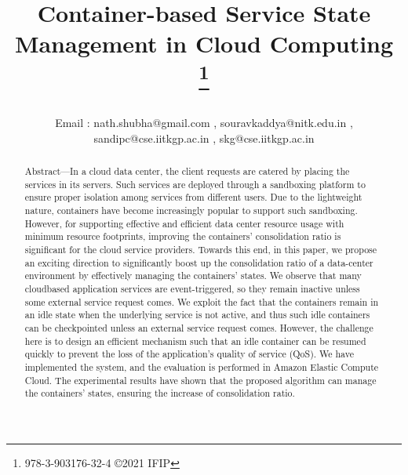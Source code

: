\documentclass[conference]{IEEEtran}
\begin{document}
\title{Container-based Service State Management in
Cloud Computing\\
\thanks{978-3-903176-32-4 ©2021 IFIP}

}

\author{
 Email : nath.shubha@gmail.com , souravkaddya@nitk.edu.in , sandipc@cse.iitkgp.ac.in , skg@cse.iitkgp.ac.in


}

\maketitle

\begin{abstract}
Abstract—In a cloud data center, the client requests are catered
by placing the services in its servers. Such services are deployed through a sandboxing platform to ensure proper isolation
among services from different users. Due to the lightweight
nature, containers have become increasingly popular to support
such sandboxing. However, for supporting effective and efficient
data center resource usage with minimum resource footprints,
improving the containers’ consolidation ratio is significant for
the cloud service providers. Towards this end, in this paper,
we propose an exciting direction to significantly boost up the
consolidation ratio of a data-center environment by effectively
managing the containers’ states. We observe that many cloudbased application services are event-triggered, so they remain
inactive unless some external service request comes. We exploit
the fact that the containers remain in an idle state when the
underlying service is not active, and thus such idle containers
can be checkpointed unless an external service request comes.
However, the challenge here is to design an efficient mechanism
such that an idle container can be resumed quickly to prevent
the loss of the application’s quality of service (QoS). We have
implemented the system, and the evaluation is performed in
Amazon Elastic Compute Cloud. The experimental results have
shown that the proposed algorithm can manage the containers’
states, ensuring the increase of consolidation ratio.

\end{abstract}
\end{document}
